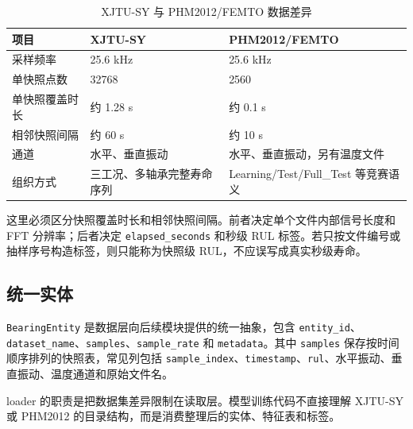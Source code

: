 \documentclass[UTF8,a4paper,12pt]{ctexart}
\newcommand{\code}[1]{\texttt{#1}}
\begin{document}
\begin{table}[H]
\centering
\caption{XJTU-SY 与 PHM2012/FEMTO 数据差异}
\begin{tabularx}{\textwidth}{p{3.2cm}Y Y}
\toprule
项目 & XJTU-SY & PHM2012/FEMTO \\
\midrule
采样频率 & 25.6 kHz & 25.6 kHz \\
单快照点数 & 32768 & 2560 \\
单快照覆盖时长 & 约 1.28 s & 约 0.1 s \\
相邻快照间隔 & 约 60 s & 约 10 s \\
通道 & 水平、垂直振动 & 水平、垂直振动，另有温度文件 \\
组织方式 & 三工况、多轴承完整寿命序列 & Learning/Test/Full\_Test 等竞赛语义 \\
\bottomrule
\end{tabularx}
\end{table}

这里必须区分快照覆盖时长和相邻快照间隔。前者决定单个文件内部信号长度和 FFT 分辨率；后者决定 \code{elapsed\_seconds} 和秒级 RUL 标签。若只按文件编号或抽样序号构造标签，则只能称为快照级 RUL，不应误写成真实秒级寿命。

\subsection{统一实体}

\code{BearingEntity} 是数据层向后续模块提供的统一抽象，包含 \code{entity\_id}、\code{dataset\_name}、\code{samples}、\code{sample\_rate} 和 \code{metadata}。其中 \code{samples} 保存按时间顺序排列的快照表，常见列包括 \code{sample\_index}、\code{timestamp}、\code{rul}、水平振动、垂直振动、温度通道和原始文件名。

loader 的职责是把数据集差异限制在读取层。模型训练代码不直接理解 XJTU-SY 或 PHM2012 的目录结构，而是消费整理后的实体、特征表和标签。
\end{document}
